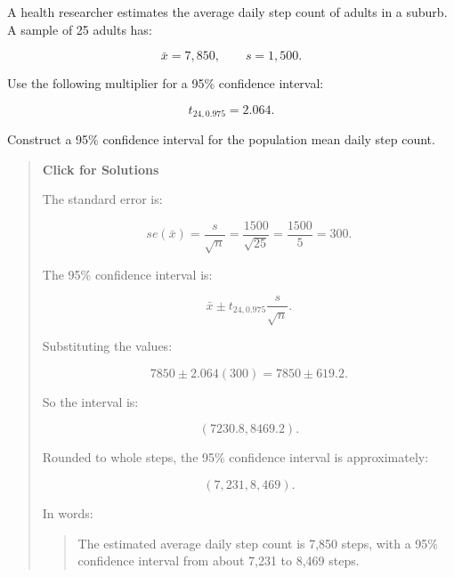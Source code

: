\documentclass[
  letterpaper,
  DIV=11,
  numbers=noendperiod]{scrreprt}
\begin{document}
\begin{tcolorbox}[enhanced jigsaw, arc=.35mm, bottomrule=.15mm, bottomtitle=1mm, breakable, colback=white, colbacktitle=quarto-callout-note-color!10!white, colframe=quarto-callout-note-color-frame, coltitle=black, left=2mm, leftrule=.75mm, opacityback=0, opacitybacktitle=0.6, rightrule=.15mm, title=\textcolor{quarto-callout-note-color}{\faInfo}\hspace{0.5em}{Question 5}, titlerule=0mm, toprule=.15mm, toptitle=1mm]

A health researcher estimates the average daily step count of adults in
a suburb. A sample of 25 adults has:

\[
\bar{x}=7{,}850,
\qquad
s=1{,}500.
\]

Use the following multiplier for a 95\% confidence interval:

\[
t_{24,0.975}=2.064.
\]

Construct a 95\% confidence interval for the population mean daily step
count.

\begin{quote}
\textbf{Click for Solutions}

The standard error is:

\[
se(\bar{x})
=
\frac{s}{\sqrt{n}}
=
\frac{1500}{\sqrt{25}}
=
\frac{1500}{5}
=
300.
\]

The 95\% confidence interval is:

\[
\bar{x}
\pm
t_{24,0.975}
\frac{s}{\sqrt{n}}.
\]

Substituting the values:

\[
7850
\pm
2.064(300)
=
7850
\pm
619.2.
\]

So the interval is:

\[
(7230.8,
8469.2).
\]

Rounded to whole steps, the 95\% confidence interval is approximately:

\[
(7{,}231,
8{,}469).
\]

In words:

\begin{quote}
The estimated average daily step count is 7,850 steps, with a 95\%
confidence interval from about 7,231 to 8,469 steps.
\end{quote}
\end{quote}

\end{tcolorbox}
\end{document}
